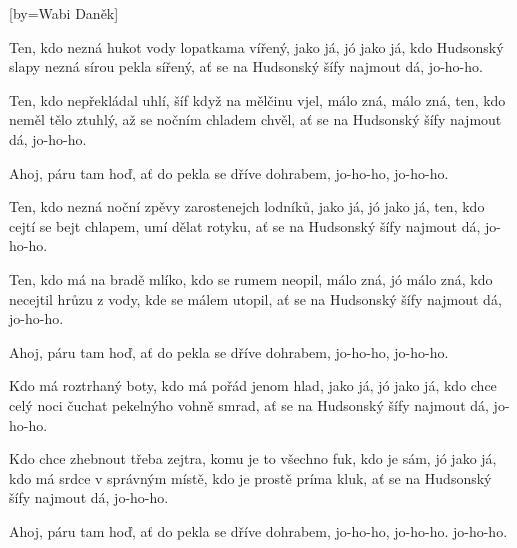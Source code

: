 [by={Wabi Daněk}]

\beginverse{}
Ten, kdo nezná hukot vody lopatkama vířený,
jako já, jó jako já,
kdo Hudsonský slapy nezná sírou pekla sířený,
ať se na Hudsonský šífy najmout dá, jo-ho-ho.
\endverse{}

\beginverse{}
Ten, kdo nepřekládal uhlí, šíf když na mělčinu vjel,
málo zná, málo zná,
ten, kdo neměl tělo ztuhlý, až se nočním chladem chvěl,
ať se na Hudsonský šífy najmout dá, jo-ho-ho.
\endverse{}

\beginchorus{}
Ahoj, páru tam hoď, ať do pekla se dříve dohrabem,
jo-ho-ho, jo-ho-ho.
\endchorus{}

\beginverse{}
Ten, kdo nezná noční zpěvy zarostenejch lodníků,
jako já, jó jako já,
ten, kdo cejtí se bejt chlapem, umí dělat rotyku,
ať se na Hudsonský šífy najmout dá, jo-ho-ho.
\endverse{}

\beginverse{}
Ten, kdo má na bradě mlíko, kdo se rumem neopil,
málo zná, jó málo zná,
kdo necejtil hrůzu z vody, kde se málem utopil,
ať se na Hudsonský šífy najmout dá, jo-ho-ho.
\endverse{}

\repeatingchorus{}
\beginchorus{}
Ahoj, páru tam hoď, ať do pekla se dříve dohrabem,
jo-ho-ho, jo-ho-ho.
\endchorus{}

\beginverse{}
Kdo má roztrhaný boty, kdo má pořád jenom hlad,
jako já, jó jako já,
kdo chce celý noci čuchat pekelnýho vohně smrad,
ať se na Hudsonský šífy najmout dá, jo-ho-ho.
\endverse{}

\beginverse{}
Kdo chce zhebnout třeba zejtra, komu je to všechno fuk,
kdo je sám, jó jako já,
kdo má srdce v správným místě, kdo je prostě príma kluk,
ať se na Hudsonský šífy najmout dá, jo-ho-ho.
\endverse{}

\beginchorus{}
Ahoj, páru tam hoď, ať do pekla se dříve dohrabem,
jo-ho-ho, jo-ho-ho.
jo-ho-ho.
\endchorus{}

\endsong{}
